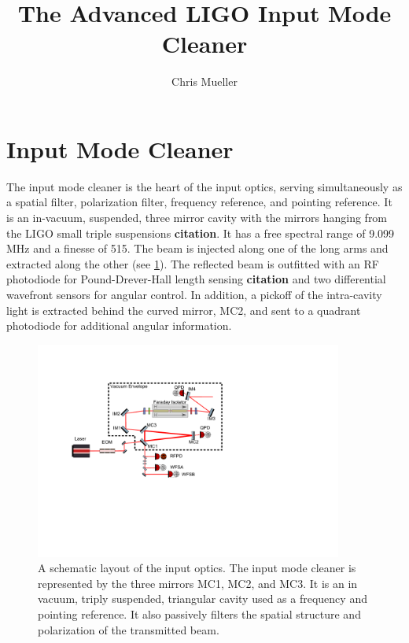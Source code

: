 \documentclass[10pt]{article}
\title{The Advanced LIGO Input Mode Cleaner}
\author{Chris Mueller}
\begin{document}
\section{Input Mode Cleaner}

The input mode cleaner is the heart of the input optics, serving simultaneously as a spatial filter, 
polarization filter, frequency reference, and pointing reference.  
It is an in-vacuum, suspended, three mirror cavity with the mirrors hanging from the LIGO small triple 
suspensions \textbf{citation}.  
It has a free spectral range of 9.099 MHz and a finesse of 515.  
The beam is injected along one of the long arms and extracted along the other (see \ref{fig:ioAll}).  
The reflected beam is outfitted with an RF photodiode for Pound-Drever-Hall length sensing \textbf{citation} 
and two differential wavefront sensors for angular control.  
In addition, a pickoff of the intra-cavity light is extracted behind the curved mirror, MC2, and sent to a 
quadrant photodiode for additional angular information.  

\begin{figure}
	\centering
	\includegraphics[width=0.9\textwidth, trim=3.5cm 7.5cm 11cm 3.5cm]{IO_Drawing.pdf}
	\caption{A schematic layout of the input optics.  
		The input mode cleaner is represented by the three mirrors MC1, MC2, and MC3.  
		It is an in vacuum, triply suspended, triangular cavity used as a frequency 
		and pointing reference.  It also passively filters the spatial structure 
		and polarization of the transmitted beam.}
	\label{fig:ioAll}
\end{figure}		

\end{document}
